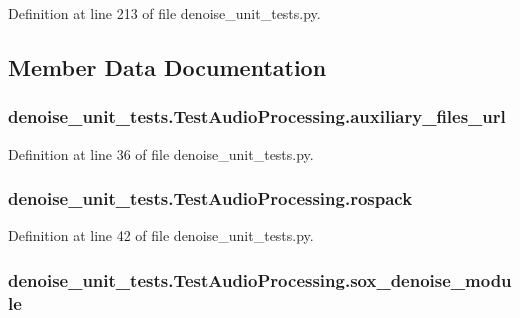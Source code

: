 Definition at line 213 of file denoise\-\_\-unit\-\_\-tests.\-py.



\subsection{Member Data Documentation}
\hypertarget{classdenoise__unit__tests_1_1TestAudioProcessing_a40e5a23bc69a679a00dee88b7992a790}{
\subsubsection[{auxiliary\-\_\-files\-\_\-url}]{\setlength{\rightskip}{0pt plus 5cm}denoise\-\_\-unit\-\_\-tests.\-Test\-Audio\-Processing.\-auxiliary\-\_\-files\-\_\-url}}\label{classdenoise__unit__tests_1_1TestAudioProcessing_a40e5a23bc69a679a00dee88b7992a790}


Definition at line 36 of file denoise\-\_\-unit\-\_\-tests.\-py.

\hypertarget{classdenoise__unit__tests_1_1TestAudioProcessing_abd4c388e17fb4ffedf516e1e0b8684a4}{
\subsubsection[{rospack}]{\setlength{\rightskip}{0pt plus 5cm}denoise\-\_\-unit\-\_\-tests.\-Test\-Audio\-Processing.\-rospack}}\label{classdenoise__unit__tests_1_1TestAudioProcessing_abd4c388e17fb4ffedf516e1e0b8684a4}


Definition at line 42 of file denoise\-\_\-unit\-\_\-tests.\-py.

\hypertarget{classdenoise__unit__tests_1_1TestAudioProcessing_a03ae317aea198943ba8f162aee887cc3}{
\subsubsection[{sox\-\_\-denoise\-\_\-module}]{\setlength{\rightskip}{0pt plus 5cm}denoise\-\_\-unit\-\_\-tests.\-Test\-Audio\-Processing.\-sox\-\_\-denoise\-\_\-module}}\label{classdenoise__unit__tests_1_1TestAudioProcessing_a03ae317aea198943ba8f162aee887cc3}


